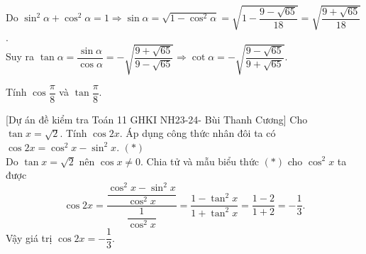 \begin{bt}
{\begin{itemize}
			Do $\sin^2 \alpha + \cos^2 \alpha = 1 \Rightarrow \sin \alpha = \sqrt{1 -\cos^2 \alpha} = \sqrt{1 - \dfrac{9 - \sqrt{65}}{18}} = \sqrt{\dfrac{9 + \sqrt{65}}{18}}$.\\
			Suy ra $\tan \alpha = \dfrac{\sin \alpha}{\cos \alpha} = - \sqrt{\dfrac{9 + \sqrt{65}}{9 - \sqrt{65}}} \Rightarrow \cot \alpha = - \sqrt{\dfrac{9 - \sqrt{65}}{9 + \sqrt{65}}}$.
		\end{itemize}
	} 
\end{bt}

\begin{bt}%
	Tính $\cos \dfrac{\pi}{8}$ và $\tan \dfrac{\pi}{8}$.
\end{bt}

\begin{bt}%
[Dự án đề kiểm tra Toán 11 GHKI NH23-24- Bùi Thanh Cương]%
	Cho $\tan x=\sqrt{2}$. Tính $\cos 2x$.
	\loigiai
	{Áp dụng công thức nhân đôi ta có $\cos 2x=\cos^2x-\sin^2x$. \hfill $(*)$\\
		Do $\tan x=\sqrt{2}$ nên $\cos x\neq 0$. Chia tử và mẫu biểu thức $(*)$ cho $\cos^2x$ ta được
		\[ \cos 2x=\dfrac{\dfrac{\cos^2x-\sin^2x}{\cos^2x}}{\dfrac{1}{\cos^2 x}}=\dfrac{1-\tan^2x}{1+\tan^2 x}=\dfrac{1-2}{1+2}=-\dfrac{1}{3}.\]  
		Vậy giá trị $\cos 2x=-\dfrac{1}{3}$.
	}
\end{bt}

